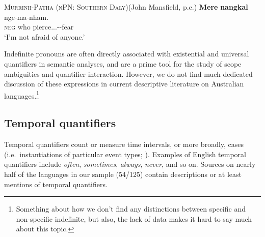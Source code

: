 \documentclass[12pt,egregdoesnotlikesansseriftitles]{scrartcl}
\makeatletter
\newcommand{\ofy}{/125} %
\makeatother
\begin{document}
\begin{exe}
  \ex\label{ex:negidf} \textsc{Murrinh-Patha (nPN: Southern Daly)}\hfill (John Mansfield, p.c.)
  \gll \textbf{Mere} \textbf{nangkal} nge-ma-nham.\\
  \textsc{neg} who pierce.\Rr.\Fsg.\Irr-\Appl-fear\\
  \glt `I'm not afraid of anyone.' %
\end{exe}

Indefinite pronouns are often directly associated with existential and universal quantifiers in semantic analyses, and are a prime tool for the study of scope ambiguities and quantifier interaction. However, we do not find much dedicated discussion of these expressions in current descriptive literature on Australian languages.\footnote{Something about how we don't find any distinctions between specific and non-specific indefinite, but also, the lack of data makes it hard to say much about this topic.} %

\subsection{Temporal quantifiers}
\label{sec:tempq}
Temporal quantifiers count or measure time intervals, or more broadly, cases (i.e.\ instantiations of particular event types; \citealt{lewis75}). Examples of English temporal quantifiers include \textit{often}, \textit{sometimes}, \textit{always}, \textit{never}, and so on.  Sources on nearly half of the languages in our sample (54\ofy) contain descriptions or at least mentions of temporal quantifiers. 
\end{document}
